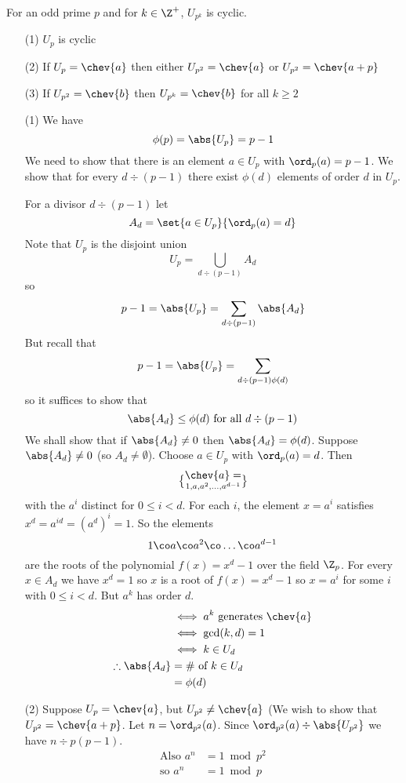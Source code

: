 \thm For an odd prime $p$ and for $k\in\Z^+$, $U_{p^k}$ is cyclic.
\begin{enumerate}
\item[(1)] $U_p$ is cyclic
\item[(2)] If $U_p=\chev{a}$ then either $U_{p^2}=\chev{a}$ or $U_{p^2}=\chev{a+p}$
\item[(3)] If $U_{p^2}=\chev{b}$ then $U_{p^k}=\chev{b}$ for all $k\geq2$
\end{enumerate}
\pf\begin{enumerate}
\item[(1)] We have
\[ \phi(p) = \abs{U_p} = p - 1 \]
We need to show that there is an element $a\in U_p$ with $\ord_p(a)=p-1$.  We show that for every $d\div(p-1)$ there exist $\phi(d)$ elements of order $d$ in $U_p$.

For a divisor $d\div(p-1)$ let
\[ A_d = \set{a\in U_p}{\ord_p(a)=d} \]
Note that $U_p$ is the disjoint union
\[ U_p = \bigcup_{d\div(p-1)}A_d \]
so
\[ p-1 = \abs{U_p} = \sum_{d\div(p-1)}\abs{A_d} \]
But recall that
\[ p-1 = \abs{U_p} = \sum_{d\div(p-1)\phi(d)} \]
so it suffices to show that
\[ \abs{A_d} \leq \phi(d) \text{ for all $d\div(p-1)$} \]
We shall show that if $\abs{A_d}\neq0$ then $\abs{A_d}=\phi(d)$.
Suppose $\abs{A_d}\neq0$ (so $A_d\neq\emptyset$).
Choose $a\in U_p$ with $\ord_p(a)=d$.
Then
\[ \chev{a} = \brace{1,a,a^2,\dotsc,a^{d-1}} \]
with the $a^i$ distinct for $0\leq i<d$.
For each $i$, the element $x=a^i$ satisfies $x^d=a^{id}=(a^d)^i=1$.
So the elements
\[ 1\co a\co a^2\co\dotsc\co a^{d-1} \]
are the roots of the polynomial $f(x)=x^d-1$ over the field $\Z_p$.
For every $x\in A_d$ we have $x^d=1$
so $x$ is a root of $f(x)=x^d-1$
so $x=a^i$ for some $i$ with $0\leq i<d$.
But $a^k$ has order $d$.
\begin{align*}
&\iff a^k \text{ generates } \chev{a} \\
&\iff \gcd(k,d) = 1 \\
&\iff k\in U_d \\
\therefore\abs{A_d} &= \text{\# of $k\in U_d$} \\
&= \phi(d)
\end{align*}
\item[(2)] Suppose $U_p=\chev{a}$, but $U_{p^2}\neq\chev{a}$ (We wish to show that $U_{p^2}=\chev{a+p}$.
Let $n=\ord_{p^2}(a)$.
Since $\ord_{p^2}(a)\div\abs{U_{p^2}}$ we have $n\div p(p-1)$.
\begin{align*}
\text{Also } a^n &= 1 \bmod p^2 \\
\text{so } a^n &= 1 \bmod p
\end{align*}

\end{enumerate}
